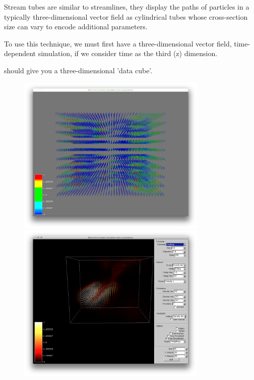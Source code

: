 
 Stream tubes are similar to streamlines, they display the paths of particles in a typically three-dimensional vector field as cylindrical tubes whose cross-section size can vary to encode additional parameters.
 
 To use this technique, we must first have a three-dimensional vector field,
 time-dependent simulation, if we consider time as the third (z) dimension. 
 
 should give you a three-dimensional 'data cube'. 
 
 \begin{figure}[htbp]
 \centering
 \begin{minipage}[t]{0.48\textwidth}
 \includegraphics[height=3in]{figures/streamtubes/30datacube_bottom.png}
 \caption{}
 \label{fig:}
 \end{minipage}\hspace{.04\textwidth}%
 \begin{minipage}[t]{0.48\textwidth}
 \includegraphics[height=3in]{figures/streamtubes/31datacube_front.png}
 \caption{}
 \label{fig:}
 \end{minipage}
 \end{figure}
 

